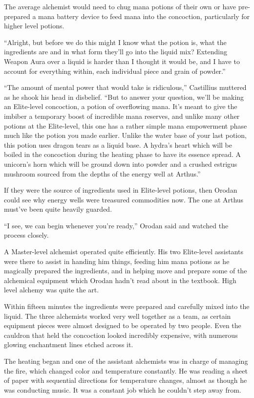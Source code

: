 \documentclass[a4paper,10pt]{book}
\begin{document}
The average alchemist would need to chug mana potions of their own or have pre-prepared a mana battery device to feed mana into the concoction, particularly for higher level potions.\par
“Alright, but before we do this might I know what the potion is, what the ingredients are and in what form they’ll go into the liquid mix? Extending Weapon Aura over a liquid is harder than I thought it would be, and I have to account for everything within, each individual piece and grain of powder.”\par
“The amount of mental power that would take is ridiculous,” Castillius muttered as he shook his head in disbelief. “But to answer your question, we’ll be making an Elite-level concoction, a potion of overflowing mana. It’s meant to give the imbiber a temporary boost of incredible mana reserves, and unlike many other potions at the Elite-level, this one has a rather simple mana empowerment phase much like the potion you made earlier. Unlike the water base of your last potion, this potion uses dragon tears as a liquid base. A hydra’s heart which will be boiled in the concoction during the heating phase to have its essence spread. A unicorn’s horn which will be ground down into powder and a crushed estrigus mushroom sourced from the depths of the energy well at Arthus.”\par
If they were the source of ingredients used in Elite-level potions, then Orodan could see why energy wells were treasured commodities now. The one at Arthus must’ve been quite heavily guarded.\par
“I see, we can begin whenever you’re ready,” Orodan said and watched the process closely.\par
A Master-level alchemist operated quite efficiently. His two Elite-level assistants were there to assist in handing him things, feeding him mana potions as he magically prepared the ingredients, and in helping move and prepare some of the alchemical equipment which Orodan hadn’t read about in the textbook. High level alchemy was quite the art.\par
Within fifteen minutes the ingredients were prepared and carefully mixed into the liquid. The three alchemists worked very well together as a team, as certain equipment pieces were almost designed to be operated by two people. Even the cauldron that held the concoction looked incredibly expensive, with numerous glowing enchantment lines etched across it.\par
The heating began and one of the assistant alchemists was in charge of managing the fire, which changed color and temperature constantly. He was reading a sheet of paper with sequential directions for temperature changes, almost as though he was conducting music. It was a constant job which he couldn’t step away from.\par
\end{document}
